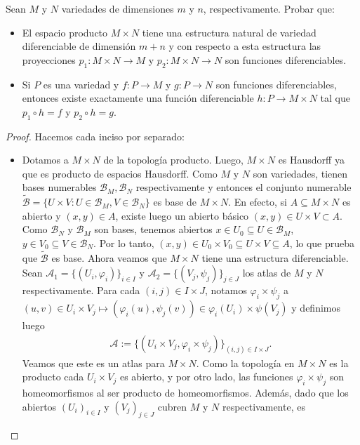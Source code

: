 \documentclass[11pt]{article}
\newcommand{\paint}[2]{\color{#1}{#2}}
\newenvironment{exercise}[2][Ejercicio]{\begin{trivlist}
\item[\hskip \labelsep \paint{purple}{{\bfseries #1}}\hskip \labelsep {\bfseries #2.}]}{\end{trivlist}}
\begin{document}
\begin{exercise}{7} Sean $M$ y $N$ variedades de dimensiones $m$ y $n$, respectivamente. Probar que:
\begin{itemize}
\item[(a)] El espacio producto $M \times N$ tiene una estructura natural de
variedad diferenciable de dimensi\'on $m+n$ y con respecto a esta estructura
las proyecciones $p_1:M\times N\to M$ y $p_2:M\times N\to N$ son funciones diferenciables.
\item[(b)] Si $P$ es una variedad y $f:P\to M$ y $g:P\to N$ son funciones
diferenciables, entonces existe exactamente una funci\'on diferenciable $h:P\to M\times N$ tal que $p_1\circ h=f$ y $p_2\circ h=g$.
\end{itemize}
\end{exercise}
\begin{proof} Hacemos cada inciso por separado:
\begin{itemize}
\item [(a)] Dotamos a $M \times N$ de la topolog\'ia producto. Luego, $M \times N$ es Hausdorff ya que es producto de espacios Hausdorff. Como $M$ y $N$ son variedades, tienen bases numerables $\mathcal{B}_M, \mathcal{B}_N$ respectivamente y entonces el conjunto numerable $\tilde{\mathcal{B}} = \{U \times V : U \in \mathcal{B}_M, V \in \mathcal{B}_N\}$ es base de $M \times N$. En efecto, si $A \subseteq M \times N$ es abierto y $(x,y) \in A$, existe luego un abierto b\'asico $(x,y) \in U \times V \subset A$. Como $\mathcal{B}_N$ y $\mathcal{B}_M$ son bases, tenemos abiertos $x \in U_0 \subseteq U \in \mathcal{B}_M$, $y \in V_0 \subseteq V \in \mathcal{B}_N$. Por lo tanto, $(x,y) \in U_0 \times V_0 \subseteq U \times V \subseteq A$, lo que prueba que $\tilde{\mathcal{B}}$ es base. Ahora veamos que $M \times N$ tiene una estructura diferenciable. Sean $\mathcal{A}_1 = \{(U_i,\varphi_i)\}_{i \in I}$ y $\mathcal{A}_2 = \{(V_j,\psi_j)\}_{j \in J}$ los atlas de $M$ y $N$ respectivamente. Para cada $(i,j) \in I \times J$, notamos $\varphi_i \times \psi_j$ a $(u,v) \in U_i \times V_j \mapsto (\varphi_i(u), \psi_j(v)) \in \varphi_i(U_i) \times \psi(V_j)$ y definimos luego
\begin{align*}
\mathcal{A} := \{(U_i \times V_j,\varphi_i \times \psi_j) \}_{(i,j) \in I \times J}.
\end{align*}
Veamos que este es un atlas para $M \times N$. Como la topolog\'ia en $M \times N$ es la producto cada $U_i \times V_j$ es abierto, y por otro lado, las funciones $\varphi_i \times \psi_j$ son homeomorfismos al ser producto de homeomorfismos. Adem\'as, dado que los abiertos $(U_i)_{i \in I}$ y $(V_j)_{j \in J}$ cubren $M$ y $N$ respectivamente, es

\end{itemize}
\end{proof}
\end{document}
